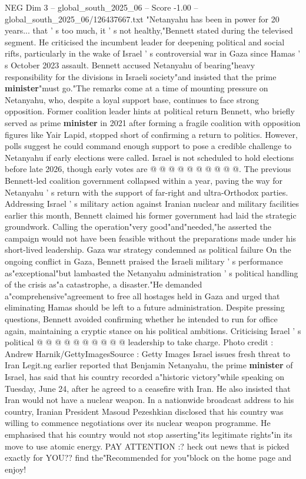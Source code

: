 \begin{textsample}{NEG Dim 3 – global\_south\_2025\_06 – Score -1.00 – global\_south\_2025\_06/126437667.txt}  \label{ex:f3_neg_267}
"Netanyahu has been in power for 20 years... that ' s too much, it ' s not healthy,"Bennett stated during the televised segment.
He criticised the incumbent leader for deepening political and social rifts, particularly in the wake of Israel ' s controversial war in Gaza since Hamas ' s October 2023 assault.
Bennett accused Netanyahu of bearing"heavy responsibility for the divisions in Israeli society"and insisted that the prime \textbf{minister}"must go."The remarks come at a time of mounting pressure on Netanyahu, who, despite a loyal support base, continues to face strong opposition.
Former coalition leader hints at political return Bennett, who briefly served as prime \textbf{minister} in 2021 after forming a fragile coalition with opposition figures like Yair Lapid, stopped short of confirming a return to politics.
However, polls suggest he could command enough support to pose a credible challenge to Netanyahu if early elections were called.
Israel is not scheduled to hold elections before late 2026, though early votes are @ @ @ @ @ @ @ @ @ @.
The previous Bennett-led coalition government collapsed within a year, paving the way for Netanyahu ' s return with the support of far-right and ultra-Orthodox parties.
Addressing Israel ' s military action against Iranian nuclear and military facilities earlier this month, Bennett claimed his former government had laid the strategic groundwork.
Calling the operation"very good"and"needed,"he asserted the campaign would not have been feasible without the preparations made under his short-lived leadership.
Gaza war strategy condemned as political failure On the ongoing conflict in Gaza, Bennett praised the Israeli military ' s performance as"exceptional"but lambasted the Netanyahu administration ' s political handling of the crisis as"a catastrophe, a disaster."He demanded a"comprehensive"agreement to free all hostages held in Gaza and urged that eliminating Hamas should be left to a future administration.
Despite pressing questions, Bennett avoided confirming whether he intended to run for office again, maintaining a cryptic stance on his political ambitions.
Criticising Israel ' s political @ @ @ @ @ @ @ @ @ @ leadership to take charge.
Photo credit : Andrew Harnik/GettyImagesSource : Getty Images Israel issues fresh threat to Iran Legit.ng earlier reported that Benjamin Netanyahu, the prime \textbf{minister} of Israel, has said that his country recorded a"historic victory"while speaking on Tuesday, June 24, after he agreed to a ceasefire with Iran.
He also insisted that Iran would not have a nuclear weapon.
In a nationwide broadcast address to his country, Iranian President Masoud Pezeshkian disclosed that his country was willing to commence negotiations over its nuclear weapon programme.
He emphasised that his country would not stop asserting"its legitimate rights"in its move to use atomic energy.
PAY ATTENTION :? heck out news that is picked exactly for YOU?? find the"Recommended for you"block on the home page and enjoy!

\end{textsample}

